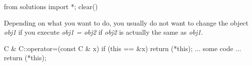 \begin{python0}
from solutions import *; clear()
\end{python0}

Depending on what you want to do, you usually do not want to change the
object \textit{obj1} if you execute \textit{obj1 = obj2} if \textit{obj2} is
actually the same as \textit{obj1}.

\begin{consolethree}[escapeinside=||]
C & C::operator=(const C & x)
{
    if (this == &x)
        return (*this);
    ... some code ...
    return (*this);
}
\end{consolethree}


